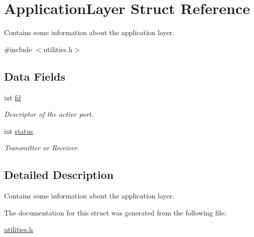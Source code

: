 \hypertarget{struct_application_layer}{}\section{Application\+Layer Struct Reference}
\label{struct_application_layer}


Contains some information about the application layer.  




{\ttfamily \#include $<$utilities.\+h$>$}

\subsection*{Data Fields}
\begin{DoxyCompactItemize}
\item 
int \hyperlink{struct_application_layer_a27603936f9300b3aea40aedfb65b069d}{fd}\hypertarget{struct_application_layer_a27603936f9300b3aea40aedfb65b069d}{}\label{struct_application_layer_a27603936f9300b3aea40aedfb65b069d}

\begin{DoxyCompactList}\small\item\em Descriptor of the active port. \end{DoxyCompactList}\item 
int \hyperlink{struct_application_layer_a0bb827ee4d01953285781ae434fbc7aa}{status}\hypertarget{struct_application_layer_a0bb827ee4d01953285781ae434fbc7aa}{}\label{struct_application_layer_a0bb827ee4d01953285781ae434fbc7aa}

\begin{DoxyCompactList}\small\item\em Transmitter or Receiver. \end{DoxyCompactList}\end{DoxyCompactItemize}


\subsection{Detailed Description}
Contains some information about the application layer. 

The documentation for this struct was generated from the following file\+:\begin{DoxyCompactItemize}
\item 
\hyperlink{utilities_8h}{utilities.\+h}\end{DoxyCompactItemize}
